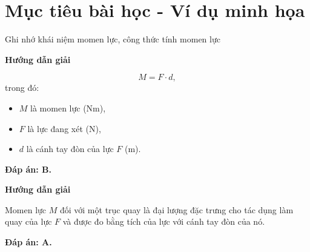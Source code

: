 \section{Mục tiêu bài học - Ví dụ minh họa}
\begin{dang}{Ghi nhớ khái niệm momen lực, công thức tính momen lực}
	{	\begin{center}
			\textbf{Hướng dẫn giải}
		\end{center}
		
		\begin{equation*}
			M = F\cdot d, \label{eq1}
		\end{equation*}
		trong đó: 
		\begin{itemize}
			\item $M$ là momen lực ($\textrm{Nm}$), 
			\item $F$ là lực đang xét ($\textrm{N}$),
			\item $d$ là cánh tay đòn của lực $F$ ($\textrm{m}$).
		\end{itemize}
		
		\textbf{Đáp án: B.}
		
	}
	{	\begin{center}
			\textbf{Hướng dẫn giải}
		\end{center}
		
		Momen lực $M$ đối với một trục quay là đại lượng đặc trưng cho tác dụng làm quay của lực $F$ và được đo bằng tích của lực với cánh tay đòn của nó.
		
		\textbf{Đáp án: A.}
		
	}
\end{dang}
